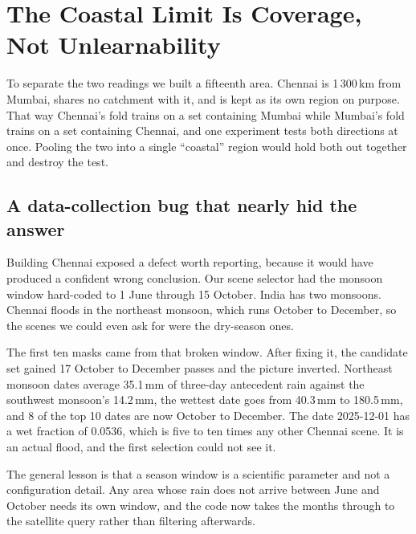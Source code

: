 \section{The Coastal Limit Is Coverage, Not Unlearnability}
\label{sec:coastal}

To separate the two readings we built a fifteenth area. Chennai is 1\,300\,km from Mumbai, shares
no catchment with it, and is kept as its own region on purpose. That way Chennai's fold trains on a
set containing Mumbai while Mumbai's fold trains on a set containing Chennai, and one experiment
tests both directions at once. Pooling the two into a single ``coastal'' region would hold both out
together and destroy the test.

\subsection{A data-collection bug that nearly hid the answer}
Building Chennai exposed a defect worth reporting, because it would have produced a confident wrong
conclusion. Our scene selector had the monsoon window hard-coded to 1 June through 15 October. India
has two monsoons. Chennai floods in the northeast monsoon, which runs October to December, so the
scenes we could even ask for were the dry-season ones.

The first ten masks came from that broken window. After fixing it, the candidate set gained 17
October to December passes and the picture inverted. Northeast monsoon dates average 35.1\,mm of
three-day antecedent rain against the southwest monsoon's 14.2\,mm, the wettest date goes from
40.3\,mm to 180.5\,mm, and 8 of the top 10 dates are now October to December. The date 2025-12-01
has a wet fraction of 0.0536, which is five to ten times any other Chennai scene. It is an actual
flood, and the first selection could not see it.

The general lesson is that a season window is a scientific parameter and not a configuration
detail. Any area whose rain does not arrive between June and October needs its own window, and the
code now takes the months through to the satellite query rather than filtering afterwards.

